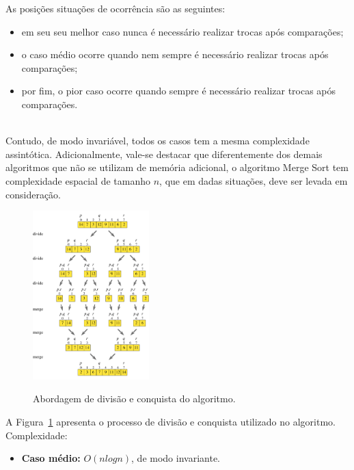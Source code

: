 \documentclass[conference]{IEEEtran}
\begin{document}
As posições situações de ocorrência são as seguintes:
\begin{itemize}
\item em seu seu melhor caso nunca é necessário realizar trocas após comparações;
\item o caso médio ocorre quando nem sempre é necessário realizar trocas após comparações;
\item por fim, o pior caso ocorre quando sempre é necessário realizar trocas após comparações.
\end{itemize}~\\

Contudo, de modo invariável, todos os casos tem a mesma complexidade assintótica. Adicionalmente, vale-se destacar que diferentemente dos demais algoritmos que não se utilizam de memória adicional, o algoritmo Merge Sort tem complexidade espacial de tamanho $n$, que em dadas situações, deve ser levada em consideração.

\begin{figure}
  \caption{Abordagem de divisão e conquista do algoritmo.}
  \centering
    \includegraphics[width=0.4\textwidth]{images/merge.png}
    \label{image:merge}
\end{figure}

A Figura~\ref{image:merge} apresenta o processo de divisão e conquista utilizado no algoritmo.\\

Complexidade:
\begin{itemize}
\item \textbf{Caso médio:} $O (nlog n)$, de modo invariante.
\end{itemize}

~\\
\end{document}
